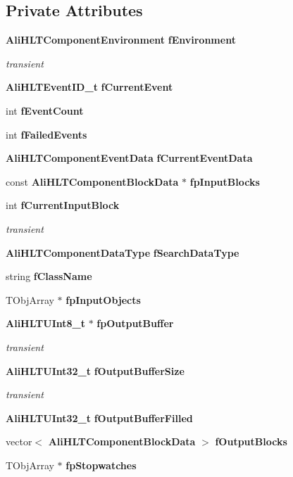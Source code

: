 \subsection*{Private Attributes}
\begin{CompactItemize}
\item 
{\bf Ali\-HLTComponent\-Environment} {\bf f\-Environment}
\begin{CompactList}\small\item\em transient \item\end{CompactList}\item 
{\bf Ali\-HLTEvent\-ID\_\-t} {\bf f\-Current\-Event}
\item 
int {\bf f\-Event\-Count}
\item 
int {\bf f\-Failed\-Events}
\item 
{\bf Ali\-HLTComponent\-Event\-Data} {\bf f\-Current\-Event\-Data}
\item 
const {\bf Ali\-HLTComponent\-Block\-Data} $\ast$ {\bf fp\-Input\-Blocks}
\item 
int {\bf f\-Current\-Input\-Block}
\begin{CompactList}\small\item\em transient \item\end{CompactList}\item 
{\bf Ali\-HLTComponent\-Data\-Type} {\bf f\-Search\-Data\-Type}
\item 
string {\bf f\-Class\-Name}
\item 
TObj\-Array $\ast$ {\bf fp\-Input\-Objects}
\item 
{\bf Ali\-HLTUInt8\_\-t} $\ast$ {\bf fp\-Output\-Buffer}
\begin{CompactList}\small\item\em transient \item\end{CompactList}\item 
{\bf Ali\-HLTUInt32\_\-t} {\bf f\-Output\-Buffer\-Size}
\begin{CompactList}\small\item\em transient \item\end{CompactList}\item 
{\bf Ali\-HLTUInt32\_\-t} {\bf f\-Output\-Buffer\-Filled}
\item 
vector$<$ {\bf Ali\-HLTComponent\-Block\-Data} $>$ {\bf f\-Output\-Blocks}
\item 
TObj\-Array $\ast$ {\bf fp\-Stopwatches}
\end{CompactItemize}
